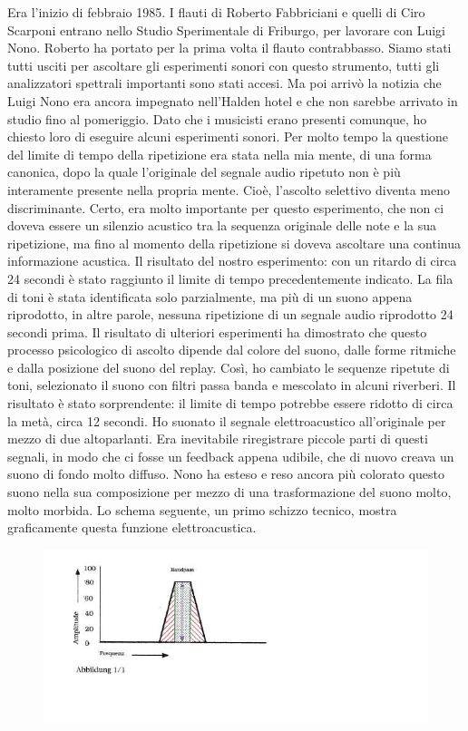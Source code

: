 Era l'inizio di febbraio 1985. I flauti di Roberto Fabbriciani e quelli di Ciro Scarponi entrano nello Studio Sperimentale di Friburgo, per lavorare con Luigi Nono. Roberto ha portato per la prima volta il flauto contrabbasso. Siamo stati tutti usciti per ascoltare gli esperimenti sonori con questo strumento, tutti gli analizzatori spettrali importanti sono stati accesi. Ma poi arrivò la notizia che Luigi Nono era ancora impegnato nell'Halden hotel e che non sarebbe arrivato in studio fino al pomeriggio. Dato che i musicisti erano presenti comunque, ho chiesto loro di eseguire alcuni esperimenti sonori. Per molto tempo la questione del limite di tempo della ripetizione era stata nella mia mente, di una forma canonica, dopo la quale l'originale del segnale audio ripetuto non è più interamente presente nella propria mente. Cioè, l'ascolto selettivo diventa meno discriminante. Certo, era molto importante per questo esperimento, che non ci doveva essere un silenzio acustico tra la sequenza originale delle note e la sua ripetizione, ma fino al momento della ripetizione si doveva ascoltare una continua informazione acustica. Il risultato del nostro esperimento: con un ritardo di circa 24 secondi è stato raggiunto il limite di tempo precedentemente indicato. La fila di toni è stata identificata solo parzialmente, ma più di un suono appena riprodotto, in altre parole, nessuna ripetizione di un segnale audio riprodotto 24 secondi prima. 
Il risultato di ulteriori esperimenti ha dimostrato che questo processo psicologico di ascolto dipende dal colore del suono, dalle forme ritmiche e dalla posizione del suono del replay. Così, ho cambiato le sequenze ripetute di toni, selezionato il suono con filtri passa banda e mescolato in alcuni riverberi. Il risultato è stato sorprendente: il limite di tempo potrebbe essere ridotto di circa la metà, circa 12 secondi. Ho suonato il segnale elettroacustico all'originale per mezzo di due altoparlanti. Era inevitabile riregistrare piccole parti di questi segnali, in modo che ci fosse un feedback appena udibile, che di nuovo creava un suono di fondo molto diffuso. Nono ha esteso e reso ancora più colorato questo suono nella sua composizione per mezzo di una trasformazione del suono molto, molto morbida. Lo schema seguente, un primo schizzo tecnico, mostra graficamente questa funzione elettroacustica. 

\begin{figure}[htbp]
\begin{center}
\includegraphics[width=1\textwidth]{images/nono/hph/ab_v_01.jpg}
\caption{}
\label{hph-img1}
\end{center}
\end{figure}

